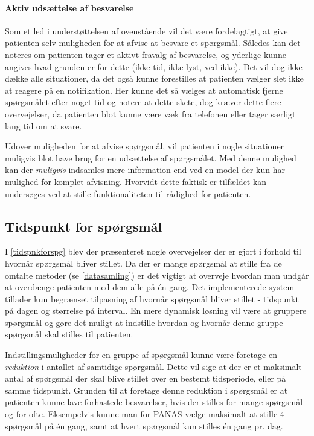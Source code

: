 \paragraph{Aktiv udsættelse af besvarelse}
Som et led i understøttelsen af ovenstående vil det være fordelagtigt, at give patienten selv muligheden for at afvise at besvare et spørgsmål.
Således kan det noteres om patienten tager et aktivt fravalg af besvarelse, og yderlige kunne angives hvad grunden er for dette (ikke tid, ikke lyst, ved ikke).
Det vil dog ikke dække alle situationer, da det også kunne forestilles at patienten vælger slet ikke at reagere på en notifikation.
Her kunne det så vælges at automatisk fjerne spørgsmålet efter noget tid og notere at dette skete, dog kræver dette flere overvejelser, da patienten blot kunne være væk fra telefonen eller tager særligt lang tid om at svare.

Udover muligheden for at afvise spørgsmål, vil patienten i nogle situationer muligvis blot have brug for en udsættelse af spørgsmålet.
Med denne mulighed kan der \textit{muligvis} indsamles mere information end ved en model der kun har mulighed for komplet afvisning.
Hvorvidt dette faktisk er tilfældet kan undersøges ved at stille funktionaliteten til rådighed for patienten.

\subsection{Tidspunkt for spørgsmål}\label{refleksion:tidspunkt}
I \cref{tidspnkforspg} blev der præsenteret nogle overvejelser der er gjort i forhold til hvornår spørgsmål bliver stillet.
Da der er mange spørgsmål at stille fra de omtalte metoder (se \cref{datasamling}) er det vigtigt at overveje hvordan man undgår at overdænge patienten med dem alle på én gang.
Det implementerede system tillader kun begrænset tilpasning af hvornår spørgsmål bliver stillet - tidspunkt på dagen og størrelse på interval.
En mere dynamisk løsning vil være at gruppere spørgsmål og gøre det muligt at indstille hvordan og hvornår denne gruppe spørgsmål skal stilles til patienten.

Indstillingsmuligheder for en gruppe af spørgsmål kunne være foretage en \emph{reduktion} i antallet af samtidige spørgsmål.
Dette vil sige at der er et maksimalt antal af spørgsmål der skal blive stillet over en bestemt tidsperiode, eller på samme tidspunkt.
Grunden til at foretage denne reduktion i spørgsmål er at patienten kunne lave forhastede besvarelser, hvis der stilles for mange spørgsmål og for ofte.
Eksempelvis kunne man for PANAS vælge maksimalt at stille 4 spørgsmål på én gang, samt at hvert spørgsmål kun stilles én gang pr. dag.


